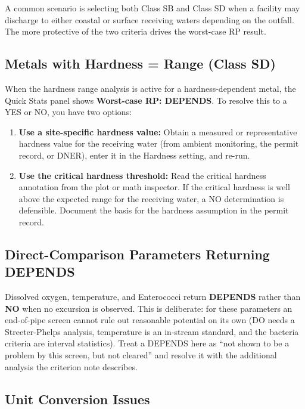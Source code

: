 \documentclass[
  11pt,
  letterpaper,
  DIV=11,
  numbers=noendperiod]{scrartcl}
\providecommand{\tightlist}{%
  \setlength{\itemsep}{0pt}\setlength{\parskip}{0pt}}
\begin{document}
A common scenario is selecting both Class SB and Class SD when a
facility may discharge to either coastal or surface receiving waters
depending on the outfall. The more protective of the two criteria drives
the worst-case RP result.

\subsection{Metals with Hardness = Range (Class
SD)}\label{sec-interpret-depends}

When the hardness range analysis is active for a hardness-dependent
metal, the Quick Stats panel shows \textbf{Worst-case RP: DEPENDS}. To
resolve this to a YES or NO, you have two options:

\begin{enumerate}
\def\labelenumi{\arabic{enumi}.}
\tightlist
\item
  \textbf{Use a site-specific hardness value:} Obtain a measured or
  representative hardness value for the receiving water (from ambient
  monitoring, the permit record, or DNER), enter it in the Hardness
  setting, and re-run.
\item
  \textbf{Use the critical hardness threshold:} Read the critical
  hardness annotation from the plot or math inspector. If the critical
  hardness is well above the expected range for the receiving water, a
  NO determination is defensible. Document the basis for the hardness
  assumption in the permit record.
\end{enumerate}

\subsection{Direct-Comparison Parameters Returning
DEPENDS}\label{sec-interpret-direct-depends}

Dissolved oxygen, temperature, and Enterococci return \textbf{DEPENDS}
rather than \textbf{NO} when no excursion is observed. This is
deliberate: for these parameters an end-of-pipe screen cannot rule out
reasonable potential on its own (DO needs a Streeter-Phelps analysis,
temperature is an in-stream standard, and the bacteria criteria are
interval statistics). Treat a DEPENDS here as ``not shown to be a
problem by this screen, but not cleared'' and resolve it with the
additional analysis the criterion note describes.

\subsection{Unit Conversion Issues}\label{sec-interpret-units}
\end{document}
